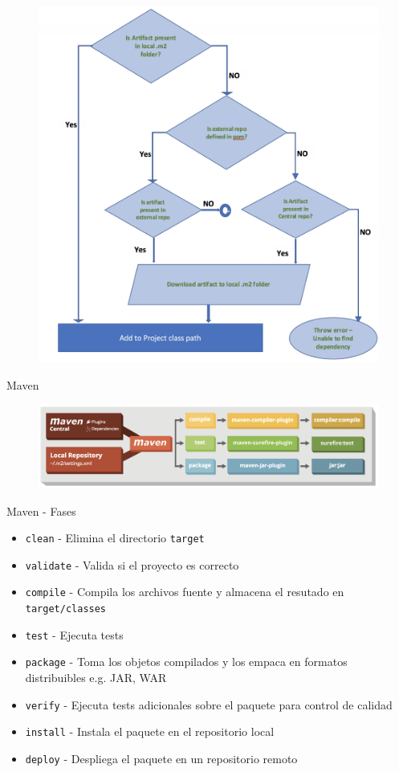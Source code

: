 \documentclass[aspectratio=169]{beamer}
\begin{document}
\begin{frame}{}
\begin{figure}
	\centering
	\includegraphics[width=0.6\linewidth]{Images/repomaven}
\end{figure}
\end{frame}

\begin{frame}{Maven}
\begin{figure}
	\centering
	\includegraphics[width=0.9\linewidth]{Images/maven}
\end{figure}
\end{frame}

\begin{frame}{Maven - Fases}
\begin{itemize}
	\item \texttt{clean} - Elimina el directorio \texttt{target}
	\item \texttt{validate} - Valida si el proyecto es correcto
	\item \texttt{compile} - Compila los archivos fuente y almacena el resutado en \texttt{target/classes}
	\item  \texttt{test} - Ejecuta tests
	\item \texttt{package} - Toma los objetos compilados y los empaca en formatos distribuibles e.g. JAR, WAR
	\item \texttt{verify} - Ejecuta tests adicionales sobre el paquete para control de calidad
	\item \texttt{install} - Instala el paquete en el repositorio local
	\item \texttt{deploy} - Despliega el paquete en un repositorio remoto
\end{itemize}
\end{frame}
\end{document}
